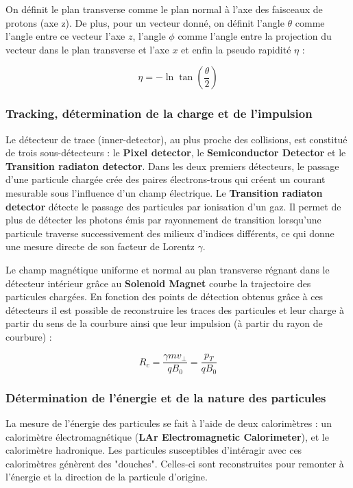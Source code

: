 \documentclass[11pt]{article} %
\begin{document}
On définit le plan transverse comme le plan normal à l'axe des faisceaux de protons (axe z).
De plus, pour un vecteur donné, on définit l'angle $\theta$ comme l'angle entre ce vecteur l'axe $z$,  l'angle $\phi$ comme l'angle entre la projection du vecteur dans le plan transverse et l'axe $x$ et enfin la pseudo rapidité $\eta$ :

\begin{equation}
\eta = -\ln \tan \left (\dfrac{\theta}{2} \right)
\end{equation}

\subsubsection{Tracking, détermination de la charge et de l'impulsion}

Le détecteur de trace (inner-detector), au plus proche des collisions, est constitué de trois sous-détecteurs : le \textbf{Pixel detector}, le \textbf{Semiconductor Detector} et le \textbf{Transition radiaton detector}. Dans les deux premiers détecteurs, le passage d'une particule chargée crée des paires électrons-trous qui créent un courant mesurable sous l'influence d'un champ électrique. 
Le \textbf{Transition radiaton detector} détecte le passage des particules par ionisation d'un gaz. Il permet de plus de détecter les photons émis par rayonnement de transition lorsqu'une particule traverse successivement des milieux d'indices différents, ce qui donne une mesure directe de son facteur de Lorentz $\gamma$.

Le champ magnétique uniforme et normal au plan transverse régnant dans le détecteur  intérieur  grâce au \textbf{Solenoid Magnet} courbe la trajectoire des particules chargées. En fonction des points de détection obtenus grâce à ces détecteurs il est possible de reconstruire les traces des particules et leur charge à partir du sens de la courbure ainsi que leur impulsion (à partir du rayon de courbure) :

\begin{equation} 
R_c = \dfrac{\gamma mv_{\perp}}{qB_0} = \dfrac{p_{T}}{qB_0}
\end{equation}

\subsubsection{Détermination de l'énergie et de la nature des particules}

La mesure de l'énergie des particules se fait à l'aide de deux calorimètres : un calorimètre électromagnétique (\textbf{LAr Electromagnetic Calorimeter}), et le calorimètre hadronique. Les particules susceptibles d'intéragir avec ces calorimètres génèrent des "douches". Celles-ci sont reconstruites pour remonter à l'énergie et la direction de la particule d'origine.
\end{document}
